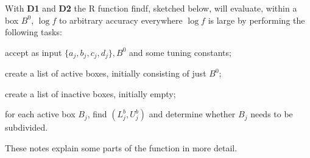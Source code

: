 \documentclass{report}
\newcommand{\textcompute}{\textsf}
\newcommand{\RL}{f}
\newcommand{\logRL}{\log\RL}
\begin{document}
With \textbf{D1} and \textbf{D2} the \textcompute{R} function \textcompute{findf}, sketched below, will evaluate, within a box $B^0$, $\logRL$ to arbitrary accuracy everywhere $\logRL$ is large by performing the following tasks:
\begin{enumerate*}[label=(\alph*)]
\item accept as input $\{a_j, b_j, c_j, d_j\}, B^0$ and some tuning constants;
\item create a list of active boxes, initially consisting of just $B^0$;
\item create a list of inactive boxes, initially empty;
\item for each active box $B_j$, find $(L^b_j, U^b_j)$ and determine whether $B_j$ needs to be subdivided.
\end{enumerate*}
 These notes explain some parts of the function in more detail.
\end{document}
